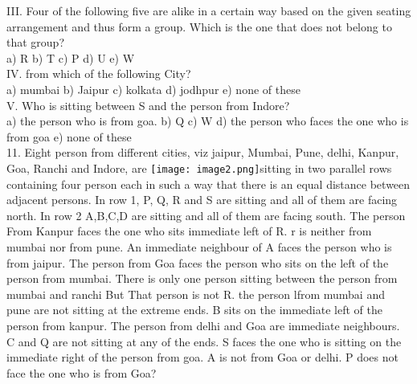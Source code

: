 \documentclass[
]{article}
\begin{document}
III. Four of the following five are alike in a certain way based on the given seating
arrangement and thus form a group. Which is the one that does not belong to that
group?\\
a) R \hspace{2mm}b) T \hspace{2mm}c) P \hspace{2mm}d) U \hspace{2mm}e) W\\

IV. from which of the following City?\\
a) mumbai \hspace{2mm}b) Jaipur \hspace{2mm}c) kolkata \hspace{2mm}d) jodhpur \hspace{2mm}e) none of these\\

V. Who is sitting between S and the person from Indore?\\
a) the person who is from goa. \hspace{2mm}b) Q \hspace{2mm}c) W
\hspace{2mm}d) the person who faces the one who is from goa \hspace{2mm}e) none of these\\

11. Eight person from different cities, viz jaipur, Mumbai, Pune, delhi, Kanpur, Goa, Ranchi and
Indore, are \texttt{[image: image2.png]}sitting in two parallel rows containing four person each in such a way that there
is an equal distance between adjacent persons. In row 1, P, Q, R and S are sitting and all of
them are facing north. In row 2 A,B,C,D are sitting and all of them are facing south. The
person From Kanpur faces the one who sits immediate left of R. r is neither from mumbai
nor from pune. An immediate neighbour of A faces the person who is from jaipur. The
person from Goa faces the person who sits on the left of the person from mumbai. There is
only one person sitting between the person from mumbai and ranchi But That person is not
R. the person lfrom mumbai and pune are not sitting at the extreme ends. B sits on the
immediate left of the person from kanpur. The person from delhi and Goa are immediate
neighbours. C and Q are not sitting at any of the ends. S faces the one who is sitting on the
immediate right of the person from goa. A is not from Goa or delhi. P does not face the one
who is from Goa?\\
\end{document}
